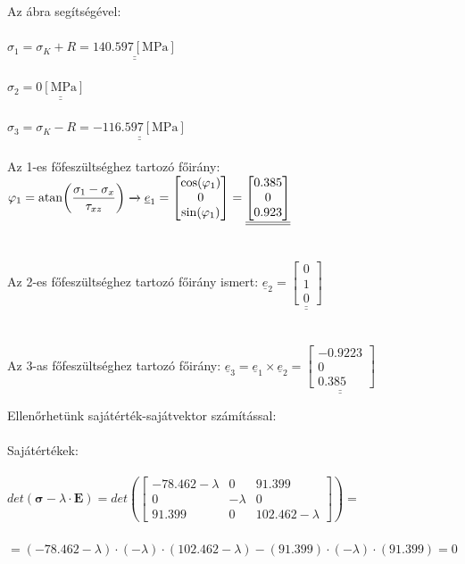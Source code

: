 \documentclass[10pt, a4paper]{article}
\newcommand{\ellenorzes}{\begin{trivlist}\item[\hskip \labelsep {\bfseries 
			{Ellenőrzés:}}]\end{trivlist}}
\newcommand{\mpa}{\mathrm{\left[MPa\right]}}
\begin{document}
	Az ábra segítségével:\\\\
	$\sigma_1 = \sigma_K + R = \underline{\underline{140.597 \mpa}}$\\\\
	$\sigma_2 = \underline{\underline{0 \mpa}}$\\\\
	$\sigma_3 = \sigma_K - R = \underline{\underline{-116.597 \mpa}}$\\\\
	Az 1-es főfeszültséghez tartozó főirány: $\varphi_1 = \atan(\dfrac{\sigma_1 - \sigma_x}{\tau_{xz}}) \xrightarrow{} \underline{e}_1 = \begin{bmatrix}\cos(\varphi_1) \\ 0 \\ \sin(\varphi_1)\end{bmatrix} = \underline{\underline{\begin{bmatrix}0.385 \\ 0 \\ 0.923\end{bmatrix}}}$\\\\\\
	Az 2-es főfeszültséghez tartozó főirány ismert: $\underline{e}_2 = \underline{\underline{\begin{bmatrix}0 \\ 1 \\ 0\end{bmatrix}}}$ \\\\\\
	Az 3-as főfeszültséghez tartozó főirány:
	$\underline{e}_3 = \underline{e}_1 \times \underline{e}_2 = \underline{\underline{\begin{bmatrix}-0.9223 \\ 0 \\ 0.385\end{bmatrix}}}$
	\newpage
	\ellenorzes
	Ellenőrhetünk sajátérték-sajátvektor számítással:\\\\
	Sajátértékek:\\\\
	$det(\boldsymbol{\sigma} - \lambda \cdot \textbf{E}) = det\left(\begin{bmatrix}
		-78.462-\lambda & 0 & 91.399\\
		0 & -\lambda & 0\\
		91.399 & 0 & 102.462-\lambda
	\end{bmatrix}\right) =$\\\\ $= (-78.462-\lambda) \cdot (-\lambda) \cdot (102.462-\lambda) - (91.399) \cdot (-\lambda) \cdot (91.399) = 0$\\\\
\end{document}
